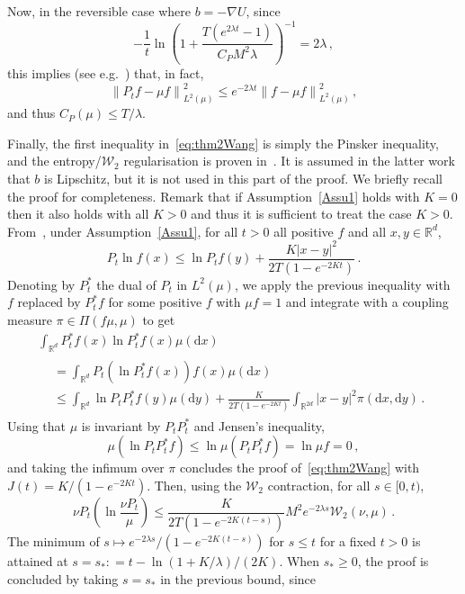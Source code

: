 \documentclass[AHL,Unicode,longabstracts,published]{cedram}
\newcommand{\R}{\mathbb R}
\newcommand{\clW}{\mathcal W}
\newcommand{\dd}{\mathrm{d}}
\newcommand{\na}{\nabla}
\newcommand{\1}{\mathbbm{1}}
\newcommand{\nv}[1]{#1}
\newcommand{\R}{\mathbb R}
\newcommand{\clW}{\mathcal W}
\begin{document}
Now, in the reversible case where $b=-\na U$, since
\[
- \frac1t \ln \left( 1+ \nv{\frac{T\left(e^{2\lambda t}-1\right)}{C_PM^2\lambda}}\right)^{-1} = 2\lambda\,,
\]
this implies (see e.g.~\cite[\nv{Lemma 2.14}]{CattiauxGuillinPAZ}) that, in fact,
\[
\left\|P_t f - \mu f\right\|_{L^2(\mu)}^2 \leqslant e^{-2\lambda t} \left\|f-\mu f\right\|_{L^2(\mu)}^2\,,
\]
and thus $C_P(\mu)\leqslant T/\lambda$.

Finally, the first inequality in~\eqref{eq:thm2Wang} is simply the Pinsker inequality, and the entropy/$\clW_2$ regularisation is proven in~\cite{RocknerWang}. It is assumed in the latter work that $b$ is Lipschitz, but it is not used in this part of the proof. We briefly recall the proof for completeness. Remark that if Assumption~\ref{Assu1} holds with $K=0$ then it also holds with all $K>0$ and thus it is sufficient to treat the case $K>0$. From~\cite[Theorem~3.3]{Wang}, under Assumption~\ref{Assu1}, for all $t>0$ all positive $f$ and all $x,y\in\R^d$,
\[
P_t \ln f(x) \leqslant \ln P_t f(y) + \frac{K|x-y|^2}{2T\left(1-e^{-2Kt}\right)} \,.
\]
Denoting by $P_t^*$ the dual of $P_t$ in $L^2(\mu)$, we apply the previous inequality with $f$ replaced by $P_t^* f$ for some positive $f$ with $\mu f= 1$ and integrate with a coupling measure $\pi \in \Pi(f\mu, \mu)$ to get
\begin{multline*}
\int_{\R^d} P_t^* f(x) \ln P_t^* f(x) \mu(\dd x)\\
\begin{aligned}
& = \int_{\R^d} P_t\left( \ln P_t^* f(x) \right) f(x) \mu(\dd x)\\
& \leqslant \int_{\R^d} \ln P_t P_t^* f(y) \mu(\dd y) + \frac{K}{2T\left(1-e^{-2Kt}\right)} \int_{\R^{2d}} |x-y|^2 \pi(\dd x,\dd y) \,.
\end{aligned}
\end{multline*}
Using that $\mu$ is invariant by $P_t P_t^*$ and Jensen's inequality,
\[
\mu\left(\ln P_tP_t^* f\right) \leqslant \ln \mu\left(P_tP_t^* f\right) = \ln \mu f = 0\,,
\]
and taking the infimum over $\pi$ concludes the proof of~\eqref{eq:thm2Wang} with $J(t) = K/(1-e^{-2Kt})$. Then, using the $\clW_2$ contraction, for all $s\in[0,t)$,
\[
\nu P_{t} \left( \ln \frac{\nu P_{t}}{\mu}\right) \leqslant \frac{K}{2T(1-e^{-2K(t-s)})} M^2 e^{-2\lambda s} \clW_2(\nu,\mu)\,.
\]
The minimum of $s\mapsto e^{-2\lambda s} /(1-e^{-2K(t-s)})$ for $s \leqslant t$ for a fixed $t>0$ is attained at $s = s_*: = t - \ln \left( 1+K/\lambda\right)/(2K)$. When $s_*\geqslant 0$, the proof is concluded by taking $s=s_*$ in the previous bound, since
\end{document}

